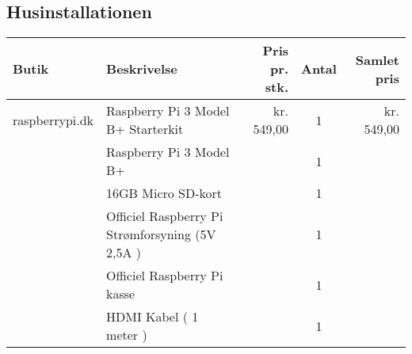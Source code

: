 \subsection{Husinstallationen}
\begin{tabular}[c]{|l|l|r|c|r|}
    \hline
    Butik & Beskrivelse & Pris pr. stk. & Antal & Samlet pris \\
    \hline \hline
    raspberrypi.dk & Raspberry Pi 3 Model B+ Starterkit &  kr. 549,00 & 1 & kr. 549,00 \\
     & Raspberry Pi 3 Model B+ & & 1 & \\
     & 16GB Micro SD-kort & & 1 & \\
     & Officiel Raspberry Pi Strømforsyning (5V \@ 2,5A ) & & 1 & \\
     & Officiel Raspberry Pi kasse & & 1 & \\
     & HDMI Kabel ( 1 meter ) & & 1 & \\
     \hline

\end{tabular}
